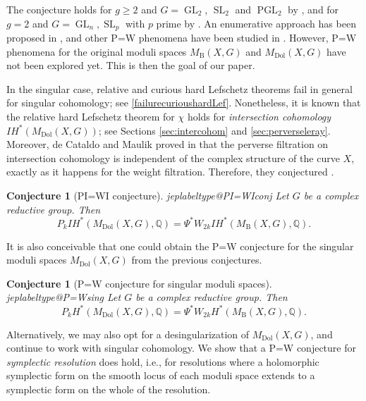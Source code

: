 \documentclass[11pt]{article}
\makeatletter
\newcommand{\ie}{i.e.,\xspace}
\newcommand{\IH}{\mathit{IH}}
\newtheorem{conj}[thm]{Conjecture}
\theoremstyle{definition}
\newcommand{\QQ}{\mathbb{Q}}
\newcommand{\Gl}{\operatorname{GL}}
\newcommand{\Sl}{\operatorname{SL}}
\newcommand{\PGl}{\operatorname{PGL}}
\newcommand{\MDolG}{{M}_{\mathrm{Dol}}(X,G)}
\newcommand{\MBG}{{M}_{\mathrm{B}}(X,G)}
\renewcommand{\label}[1]{\ifcsname jeplabeltype@#1\endcsname
\edef\jeplabeltype{\csname jeplabeltype@#1\endcsname}\expandafter\jeporiginalLabel\expandafter[\jeplabeltype]{#1}\else\jeporiginalLabel{#1}\fi}}
\makeatother
\begin{document}
The conjecture holds for $g\geq 2$ and $G=\Gl_2$, $\Sl_2$ and $\PGl_2$ by \cite{deCataldoHauselMigliorini2012}, and for $g=2$ and $G=\Gl_n, \Sl_p$ with $p$ prime by \cite{deCataldoMaulikShen2019, deCataldoMaulikShen2020}. An enumerative approach has been proposed in \cite{CHS2020}, and other P=W phenomena have been studied in
\cite{ShenZhang2018, ShenYin2018, FelisettiShenYin2021, ZhangZili2019, Szabo2018, Szabo2019, NemethiSzabo2020, HKP2019, Harder2019, HLSY2019, Mauri2021}.
However, P=W phenomena for the original moduli spaces $\MBG$ and $\MDolG$ have not been explored yet. This is then the goal of our paper.

In the singular case, relative and curious hard Lefschetz theorems fail in general for singular cohomology; see \cref{failurecurioushardLef}. Nonetheless, it is known that the relative hard Lefschetz theorem for $\chi$ holds for \emph{intersection cohomology} $\IH^*(\MDolG)$; see Sections \ref{sec:intercohom} and \ref{sec:perverseleray}.
Moreover, de Cataldo and Maulik proved in \cite{deCataldoMaulik2018} that the perverse filtration on intersection cohomology is independent of the complex structure of the curve $X$, exactly as it happens for the weight filtration. Therefore, they conjectured \cite[Quest.\,4.1.7]{deCataldoMaulik2018}.

\begin{conj}[PI=WI conjecture]\label{PI=WIconj} Let $G$ be a complex reductive group. Then
\[
P_k \IH^*(\MDolG, \QQ)= \Psi^* W_{2k}\IH^*(\MBG, \QQ).
\]
\end{conj}

It is also conceivable that one could obtain the P=W conjecture for the singular moduli spaces $\MDolG$ from the previous conjectures.
\begin{conj}[P=W conjecture for singular moduli spaces] \label{P=Wsing} Let $G$ be a complex reductive group. Then
\[
P_kH^*(\MDolG, \QQ) = {\Psi}^* W_{2k}H^*(\MBG, \QQ).
\]
\end{conj}

Alternatively, we may also opt for a desingularization of $\MDolG$, and continue to work with singular cohomology. We show that a P=W conjecture for \emph{symplectic resolution} does hold, \ie for resolutions where a holomorphic symplectic form on the smooth locus of each moduli space extends to a symplectic form on the whole of the resolution.
\end{document}
